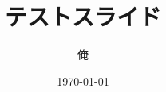 \documentclass{beamer} %
\title{テストスライド}
\author{俺}
\date{\today}
\begin{document}
\begin{frame}
    \maketitle
\end{frame}
\end{document}
